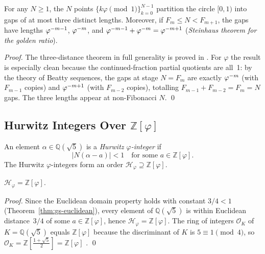 \begin{theorem}\label{thm:gs-3dist}
For any \(N \ge 1\), the \(N\) points
\(\{k\varphi \pmod{1}\}_{k=0}^{N-1}\) partition the circle
\([0,1)\) into gaps of at most three distinct lengths.  Moreover,
if \(F_m \le N < F_{m+1}\), the gaps have lengths \(\varphi^{-m-1}\),
\(\varphi^{-m}\), and \(\varphi^{-m-1} + \varphi^{-m} = \varphi^{-m+1}\)
(\emph{Steinhaus theorem for the golden ratio}).
\end{theorem}

\begin{proof}
The three-distance theorem in full generality is proved in
\cite{vajda_fib_lucas}.  For \(\varphi\) the result is especially
clean because the continued-fraction partial quotients are all~1:
by the theory of Beatty sequences, the gaps at stage \(N = F_m\)
are exactly \(\varphi^{-m}\) (with \(F_{m-1}\) copies) and
\(\varphi^{-m+1}\) (with \(F_{m-2}\) copies), totalling
\(F_{m-1} + F_{m-2} = F_m = N\) gaps.  The three lengths appear
at non-Fibonacci \(N\).
\qed
\end{proof}

\subsection{Hurwitz Integers Over \(\mathbb{Z}[\varphi]\)}
\label{subsec:gs-hurwitz-integers}

\begin{definition}\label{def:gs-hurwitz-int}
An element \(\alpha \in \mathbb{Q}(\sqrt{5})\) is a
\emph{Hurwitz \(\varphi\)-integer} if
\[
  |N(\alpha - a)| < 1 \quad \text{for some } a \in \mathbb{Z}[\varphi] .
\]
The Hurwitz \(\varphi\)-integers form an order \(\mathcal{H}_\varphi
\supseteq \mathbb{Z}[\varphi]\).
\end{definition}

\begin{lemma}\label{lem:gs-hurwitz-order}
\(\mathcal{H}_\varphi = \mathbb{Z}[\varphi]\).
\end{lemma}

\begin{proof}
Since the Euclidean domain property holds with constant \(3/4 < 1\)
(Theorem~\ref{thm:gs-euclidean}), every element of
\(\mathbb{Q}(\sqrt{5})\) is within Euclidean distance~\(3/4\) of
some \(a \in \mathbb{Z}[\varphi]\), hence \(\mathcal{H}_\varphi =
\mathbb{Z}[\varphi]\).  The ring of integers \(\mathcal{O}_K\) of
\(K = \mathbb{Q}(\sqrt{5})\) equals \(\mathbb{Z}[\varphi]\) because
the discriminant of \(K\) is \(5 \equiv 1 \pmod{4}\), so
\(\mathcal{O}_K = \mathbb{Z}[\frac{1+\sqrt{5}}{2}] = \mathbb{Z}[\varphi]\)
\cite{ireland_rosen}.
\qed
\end{proof}

